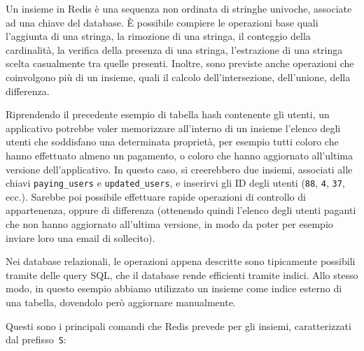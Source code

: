 Un insieme in Redis è una sequenza non ordinata di stringhe univoche, associate ad una chiave del
database. È possibile compiere le operazioni base quali l'aggiunta di una stringa, la rimozione di
una stringa, il conteggio della cardinalità, la verifica della presenza di una stringa, l'estrazione
di una stringa scelta casualmente tra quelle presenti. Inoltre, sono previste anche operazioni che
coinvolgono più di un insieme, quali il calcolo dell'intersezione, dell'unione, della differenza.

Riprendendo il precedente esempio di tabella hash contenente gli utenti, un applicativo potrebbe
voler memorizzare all'interno di un insieme l'elenco degli utenti che soddisfano una determinata
proprietà, per esempio tutti coloro che hanno effettuato almeno un pagamento, o coloro che hanno
aggiornato all'ultima versione dell'applicativo. In questo caso, si creerebbero due
insiemi, associati alle chiavi \verb|paying_users| e \verb|updated_users|, e inserirvi gli ID degli
utenti (\verb|88|, \verb|4|, \verb|37|, ecc.). Sarebbe poi possibile effettuare rapide operazioni di
controllo di appartenenza, oppure di differenza (ottenendo quindi l'elenco degli utenti paganti che
non hanno aggiornato all'ultima versione, in modo da poter per esempio inviare loro una email di
sollecito).

Nei database relazionali, le operazioni appena descritte sono tipicamente possibili tramite delle
query SQL, che il database rende efficienti tramite indici. Allo stesso modo, in questo esempio
abbiamo utilizzato un insieme come indice esterno di una tabella, dovendolo però aggiornare
manualmente.

Questi sono i principali comandi che Redis prevede per gli insiemi, caratterizzati dal
prefisso~\verb|S|:

